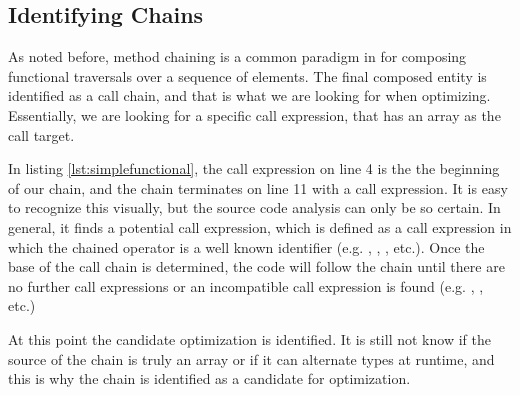 \subsection{Identifying Chains}

As noted before, method chaining is a common paradigm in \javascript for composing functional traversals over a sequence of elements.  The final composed entity is identified as a call chain, and that is what we are looking for when optimizing.  Essentially, we are looking for a specific call expression, that has an array as the call target. \\

\begin{minipage}{\linewidth}

\end{minipage}

In listing \ref{lst:simplefunctional}, the  call expression on line 4 is the the beginning of our chain, and the chain terminates on line 11 with a  call expression.  It is easy to recognize this visually, but the source code analysis can only be so certain.  In general, it finds a potential call expression, which is defined as a call expression in which the chained operator is a well known identifier (e.g. , , , etc.). Once the base of the call chain is determined, the code will follow the chain until there are no further call expressions or an incompatible call expression is found (e.g. , , etc.)

At this point the candidate optimization is identified.  It is still not know if the source of the chain is truly an array or if it can alternate types at runtime, and this is why the chain is identified as a candidate for optimization. 